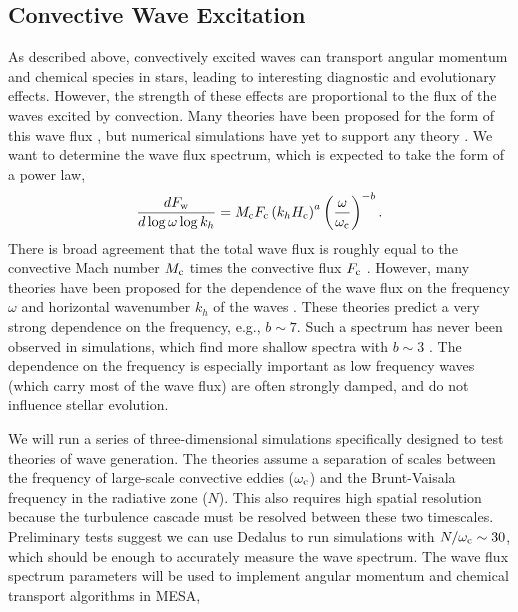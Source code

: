 {\color{purple}
\subsection{Convective Wave Excitation}
}

As described above, convectively excited waves can transport angular momentum and chemical species in stars, leading to interesting diagnostic and evolutionary effects. However, the strength of these effects are proportional to the flux of the waves excited by convection. Many theories have been proposed for the form of this wave flux \citep{Press_1981,Goldreich_1990,Belkacem_2008,Lecoanet_2013}, but numerical simulations have yet to support any theory \citep{Rogers_2006,Rogers_2013,Alvan_2014,Lecoanet_2015}. We want to determine the wave flux spectrum, which is expected to take the form of a power law,
\begin{equation}
\frac{d F_{\rm w}}{d\log \omega \log k_h} = M_{\rm c}F_{\rm c} \left(k_h H_{\rm c}\right)^{a} \left(\frac{\omega}{\omega_{\rm c}}\right)^{-b}.
\end{equation}
There is broad agreement that the total wave flux is roughly equal to the convective Mach number $M_{\rm c}$ times the convective flux $F_{\rm c}$ \citep[e.g.,][]{Rogers_2013,Lecoanet_2015}. However, many theories have been proposed for the dependence of the wave flux on the frequency $\omega$ and horizontal wavenumber $k_h$ of the waves \citep[see][]{Lecoanet_2013}. These theories predict a very strong dependence on the frequency, e.g., $b\sim 7$. Such a spectrum has never been observed in simulations, which find more shallow spectra with $b\sim 3$ \citep{Rogers_2013}. The dependence on the frequency is especially important as low frequency waves (which carry most of the wave flux) are often strongly damped, and do not influence stellar evolution. 

We will run a series of three-dimensional simulations specifically designed to test theories of wave generation. The theories assume a separation of scales between the frequency of large-scale convective eddies ($\omega_{\rm c}$) and the Brunt-Vaisala frequency in the radiative zone ($N$). This also requires high spatial resolution because the turbulence cascade must be resolved between these two timescales. Preliminary tests suggest we can use Dedalus to run simulations with $N/\omega_{\rm c}\sim 30$, which should be enough to accurately measure the wave spectrum. The wave flux spectrum parameters will be used to implement angular momentum and chemical transport algorithms in MESA, %

